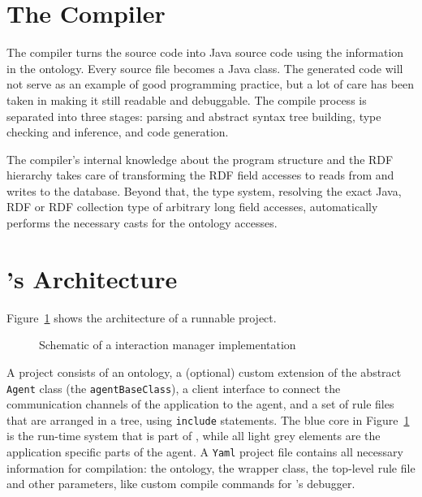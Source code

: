 \newcommand{\caret}{{\large\textbf{\textasciicircum}}}

\section{The \vonda Compiler}

The compiler turns the \vonda source code into Java source code using the
information in the ontology. Every source file becomes a Java class. The
generated code will not serve as an example of good programming practice, but a
lot of care has been taken in making it still readable and debuggable. The
compile process is separated into three stages: parsing and abstract syntax
tree building, type checking and inference, and code generation.

The \vonda compiler's internal knowledge about the program structure and the
RDF hierarchy takes care of transforming the RDF field accesses to reads from
and writes to the database. Beyond that, the type system, resolving the exact
Java, RDF or RDF collection type of arbitrary long field accesses,
automatically performs the necessary casts for the ontology accesses.

\section{\vonda's Architecture}

Figure~\ref{fig:architecture} shows the architecture of a runnable \vonda project.

\begin{figure}[htbp]
  \centering
  
  \caption{Schematic of a \vonda interaction manager implementation}
  \label{fig:architecture}
\end{figure}

A \vonda project consists of an ontology, a (optional) custom
extension of the abstract \texttt{Agent} class (the
\texttt{agentBaseClass}), a client interface to connect the
communication channels of the application to the agent, and a set of
rule files that are arranged in a tree, using \texttt{include}
statements. The blue core in Figure~\ref{fig:architecture} is the
run-time system that is part of \vonda, while all light grey elements
are the application specific parts of the agent. A \texttt{Yaml}
project file contains all necessary information for compilation: the
ontology, the wrapper class, the top-level rule file and other
parameters, like custom compile commands for \vonda's debugger.


